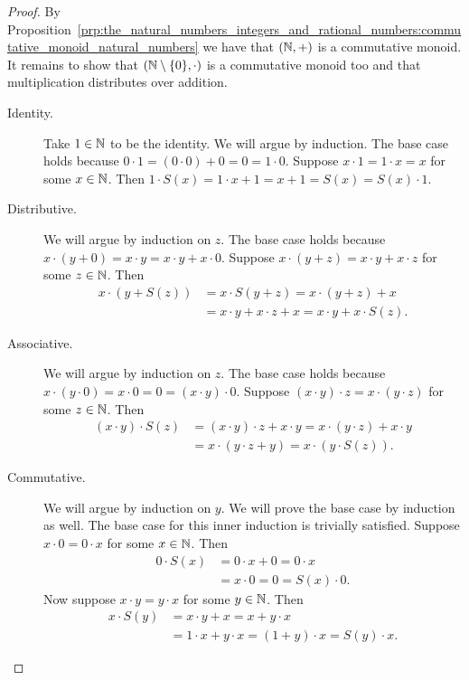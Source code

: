 \documentclass[../main.tex]{subfiles}
\begin{document}
\begin{proof}
    By Proposition~\ref{prp:the_natural_numbers_integers_and_rational_numbers:commutative_monoid_natural_numbers} we have that $(\mathbb{N},+)$ is a commutative monoid. It remains to show that $(\mathbb{N}\setminus\{0\},\cdot)$ is a commutative monoid too and that multiplication distributes over addition.
    \begin{description}
        \item[Identity.] Take $1\in\mathbb{N}$ to be the identity. We will argue by induction. The base case holds because $0\cdot1=(0\cdot0)+0=0=1\cdot0$. Suppose $x\cdot1=1\cdot x=x$ for some $x\in\mathbb{N}$. Then $1\cdot S(x)=1\cdot x+1=x+1=S(x)=S(x)\cdot 1$.
        \item[Distributive.] We will argue by induction on $z$. The base case holds because $x\cdot(y+0)=x\cdot y=x\cdot y+x\cdot 0$. Suppose $x\cdot(y+z)=x\cdot y+x\cdot z$ for some $z\in\mathbb{N}$. Then
        \begin{align*}
            x\cdot(y+S(z)) & =x\cdot S(y+z)=x\cdot(y+z)+x \\
            & =x\cdot y+x\cdot z+x=x\cdot y+x\cdot S(z).
        \end{align*}
        \item[Associative.] We will argue by induction on $z$. The base case holds because $x\cdot(y\cdot0)=x\cdot0=0=(x\cdot y)\cdot0$. Suppose $(x\cdot y)\cdot z=x\cdot(y\cdot z)$ for some $z\in\mathbb{N}$. Then
        \begin{align*}
            (x\cdot y)\cdot S(z) & =(x\cdot y)\cdot z+x\cdot y=x\cdot(y\cdot z)+x\cdot y \\
            & =x\cdot(y\cdot z+y)=x\cdot(y\cdot S(z)).
        \end{align*}
        \item[Commutative.] We will argue by induction on $y$. We will prove the base case by induction as well. The base case for this inner induction is trivially satisfied. Suppose $x\cdot0=0\cdot x$ for some $x\in\mathbb{N}$. Then
        \begin{align*}
            0\cdot S(x) & =0\cdot x+0=0\cdot x \\
            & =x\cdot 0=0=S(x)\cdot 0.
        \end{align*}
        Now suppose $x\cdot y=y\cdot x$ for some $y\in\mathbb{N}$. Then
        \begin{align*}
            x\cdot S(y) & =x\cdot y+x=x+y\cdot x \\
            & =1\cdot x+y\cdot x=(1+y)\cdot x=S(y)\cdot x.
        \end{align*}
    \end{description}
\end{proof}
\end{document}

